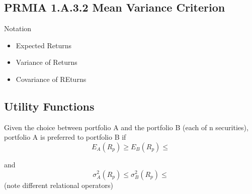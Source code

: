 
\subsection{PRMIA 1.A.3.2 Mean Variance Criterion}
Notation
\begin{itemize}
\item Expected Returns
\item Variance of Returns
\item Covariance of REturns
\end{itemize}
\subsection{Utility Functions}
Given the choice between portfolio A and the portfolio B (each of n securities), portfolio A is preferred to portfolio B if
\[ E_A (R_p) \geq E_B (R_p) \leq \]

and 
\[ \sigma^2_A (R_p) \leq \sigma^2_B (R_p) \leq \]
(note different relational operators)
